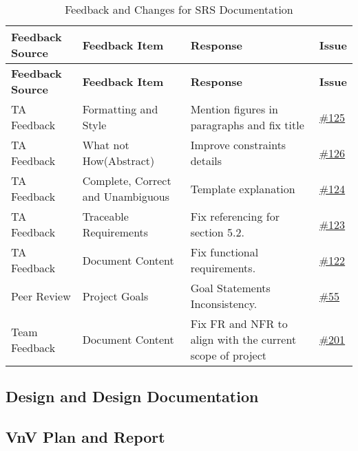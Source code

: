 \documentclass{article}
\begin{document}
\begin{longtable}{| p{} | p{} | p{} | p{} |}
    \caption{Feedback and Changes for SRS Documentation} \\
    \hline
    \textbf{Feedback Source} & \textbf{Feedback Item} & \textbf{Response} & \textbf{Issue} \\
    \hline
    \endfirsthead
    \hline
    \textbf{Feedback Source} & \textbf{Feedback Item} & \textbf{Response} & \textbf{Issue} \\
    \hline
    \endhead
    \hline
    \endfoot
    TA Feedback & Formatting and Style & Mention figures in paragraphs and fix title & \href{https://github.com/RezaJodeiri/CXR-Capstone/issues/125}{\#125}\\
    \hline
    TA Feedback & What not How(Abstract) & Improve constraints details & \href{https://github.com/RezaJodeiri/CXR-Capstone/issues/126}{\#126} \\
    \hline
    TA Feedback & Complete, Correct and Unambiguous & Template explanation & \href{https://github.com/RezaJodeiri/CXR-Capstone/issues/124}{\#124}\\
    \hline
    TA Feedback & Traceable Requirements & Fix referencing for section 5.2. & \href{https://github.com/RezaJodeiri/CXR-Capstone/issues/123}{\#123} \\
    \hline
    TA Feedback & Document Content & Fix functional requirements. & \href{https://github.com/RezaJodeiri/CXR-Capstone/issues/122}{\#122} \\
    \hline
    Peer Review & Project Goals & Goal Statements Inconsistency. & \href{https://github.com/RezaJodeiri/CXR-Capstone/issues/55}{\#55} \\
    \hline
    Team Feedback & Document Content & Fix FR and NFR to align with the current scope of project & \href{https://github.com/RezaJodeiri/CXR-Capstone/issues/201}{\#201}\\
    \hline

\end{longtable}

\subsection{Design and Design Documentation}

\subsection{VnV Plan and Report}
\end{document}
